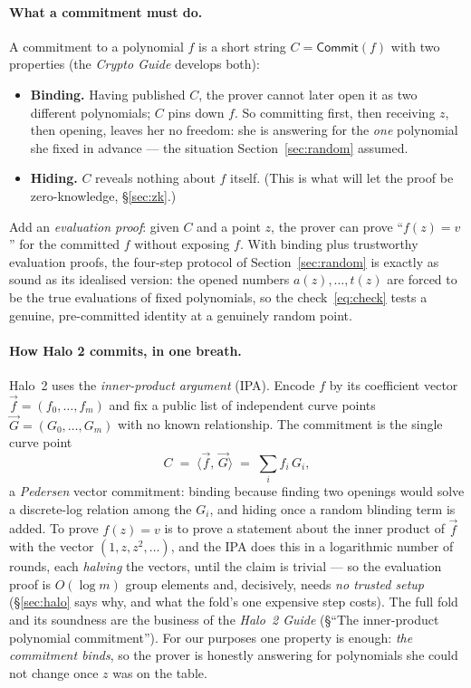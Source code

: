 \documentclass[11pt,a4paper]{article}
\theoremstyle{definition}
\newcommand{\ip}[2]{\langle #1,\, #2 \rangle}
\newcommand{\Comm}{\mathsf{Commit}}
\begin{document}
\paragraph{What a commitment must do.} A commitment to a polynomial $f$ is a
short string $C = \Comm(f)$ with two properties (the \emph{Crypto Guide}
develops both):
\begin{itemize}[leftmargin=*,itemsep=1pt]
\item \textbf{Binding.} Having published $C$, the prover cannot later open it as
two different polynomials; $C$ pins down $f$. So committing first, then
receiving $z$, then opening, leaves her no freedom: she is answering for the
\emph{one} polynomial she fixed in advance --- the situation
Section~\ref{sec:random} assumed.
\item \textbf{Hiding.} $C$ reveals nothing about $f$ itself. (This is what
will let the proof be zero-knowledge, \S\ref{sec:zk}.)
\end{itemize}
Add an \emph{evaluation proof}: given $C$ and a point $z$, the prover can prove
``$f(z) = v$'' for the committed $f$ without exposing $f$. With binding plus
trustworthy evaluation proofs, the four-step protocol of
Section~\ref{sec:random} is exactly as sound as its idealised version: the
opened numbers $a(z), \dots, t(z)$ are forced to be the true evaluations of
fixed polynomials, so the check~\eqref{eq:check} tests a genuine, pre-committed
identity at a genuinely random point.

\paragraph{How Halo 2 commits, in one breath.} Halo~2 uses the
\emph{inner-product argument} (IPA). Encode $f$ by its coefficient vector
$\vec f = (f_0, \dots, f_{m})$ and fix a public list of independent curve
points $\vec G = (G_0, \dots, G_{m})$ with no known relationship. The
commitment is the single curve point
\[
C \;=\; \ip{\vec f}{\vec G} \;=\; \sum_i f_i\,G_i,
\]
a \emph{Pedersen} vector commitment: binding because finding two openings would
solve a discrete-log relation among the $G_i$, and hiding once a random
blinding term is added. To prove $f(z) = v$ is to prove a statement about the
inner product of $\vec f$ with the vector $(1, z, z^2, \dots)$, and the IPA
does this in a logarithmic number of rounds, each \emph{halving} the vectors,
until the claim is trivial --- so the evaluation proof is $O(\log m)$ group
elements and, decisively, needs \emph{no trusted setup}
(\S\ref{sec:halo} says why, and what the fold's one expensive step
costs). The full fold and its soundness are the business of the
\emph{Halo~2 Guide} (\S``The inner-product polynomial commitment'').
For our purposes one property is enough:
\emph{the commitment binds}, so the prover is honestly answering for
polynomials she could not change once $z$ was on the table.
\end{document}
